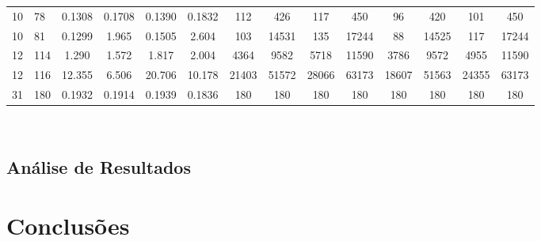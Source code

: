 \documentclass[12pt,a4paper]{article}
\begin{document}
\begin{adjustbox}{width={\textwidth}, totalheight={\textheight}, keepaspectratio}
\begin{tabular}{ll cccc cccc cccc}
    10                        & 78                                        & 0.1308                          & 0.1708                             & 0.1390 & 0.1832 & 112   & 426   & 117   & 450   & 96    & 420   & 101   & 450   \\
    10                        & 81                                        & 0.1299                          & 1.965                              & 0.1505 & 2.604  & 103   & 14531 & 135   & 17244 & 88    & 14525 & 117   & 17244 \\
    12                        & 114                                       & 1.290                           & 1.572                              & 1.817  & 2.004  & 4364  & 9582  & 5718  & 11590 & 3786  & 9572  & 4955  & 11590 \\
    12                        & 116                                       & 12.355                          & 6.506                              & 20.706 & 10.178 & 21403 & 51572 & 28066 & 63173 & 18607 & 51563 & 24355 & 63173 \\
    31                        & 180                                       & 0.1932                          & 0.1914                             & 0.1939 & 0.1836 & 180   & 180   & 180   & 180   & 180   & 180   & 180   & 180   \\
    \bottomrule
  \end{tabular}
\end{adjustbox} \\


\subsection{Análise de Resultados}


\section{Conclusões}
\end{document}
